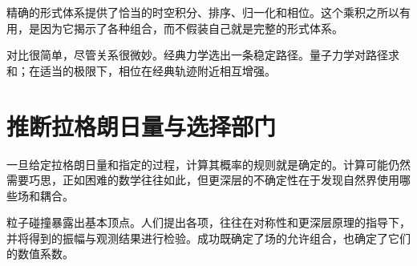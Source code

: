 \begin{classroomqa}
\end{classroomqa}

\begin{classroomqa}
\end{classroomqa}

精确的形式体系提供了恰当的时空积分、排序、归一化和相位。这个乘积之所以有用，是因为它揭示了各种组合，而不假装自己就是完整的形式体系。

\begin{classroomqa}
\end{classroomqa}

对比很简单，尽管关系很微妙。经典力学选出一条稳定路径。量子力学对路径求和；在适当的极限下，相位在经典轨迹附近相互增强。

\section{推断拉格朗日量与选择部门}

一旦给定拉格朗日量和指定的过程，计算其概率的规则就是确定的。计算可能仍然需要巧思，正如困难的数学往往如此，但更深层的不确定性在于发现自然界使用哪些场和耦合。

\begin{classroomqa}
\end{classroomqa}

粒子碰撞暴露出基本顶点。人们提出各项，往往在对称性和更深层原理的指导下，并将得到的振幅与观测结果进行检验。成功既确定了场的允许组合，也确定了它们的数值系数。

